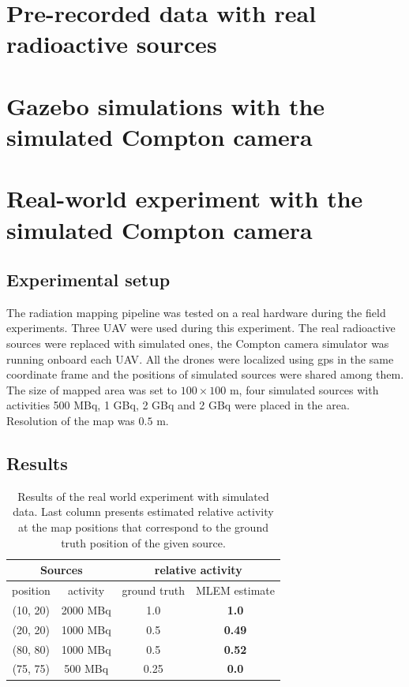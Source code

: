 \section{Pre-recorded data with real radioactive sources}


\section{Gazebo simulations with the simulated Compton camera}

\section{Real-world experiment with the simulated Compton camera}
\subsection{Experimental setup}
The radiation mapping pipeline was tested on a real hardware during the field experiments.
Three \ac{UAV} were used during this experiment.
The real radioactive sources were replaced with simulated ones, the Compton camera simulator \cite{TODO} was running onboard each \ac{UAV}.
All the drones were localized using \ac{gps} in the same coordinate frame and the positions of simulated sources were shared among them.
The size of mapped area was set to $100 \times 100$ m, four simulated sources with activities 500 MBq, 1 GBq, 2 GBq and 2 GBq were placed in the area.
Resolution of the map was $0.5$ m.

\subsection{Results}
\begin{table}[htb]
\begin{center}
  \begin{tabular}{ |c|c|c|c| } 
 \hline
    \multicolumn{2}{|c}{Sources} &  \multicolumn{2}{|c|}{ relative activity } \\
 \hline
    position & activity & ground truth & MLEM estimate\\ 
 \hline
    (10, 20) & 2000 MBq & 1.0  & \textbf{1.0} \\ 
    (20, 20) & 1000 MBq &  0.5 & \textbf{0.49} \\ 
    (80, 80) & 1000 MBq &  0.5 & \textbf{0.52} \\ 
    (75, 75) & 500 MBq &  0.25 & \textbf{0.0} \\ 
 \hline
\end{tabular}
  \caption{Results of the real world experiment with simulated data. Last column presents estimated relative activity at the map positions that correspond to the ground truth position of the given source.}
  \label{tab:temenight_results}
\end{center}
\end{table}


